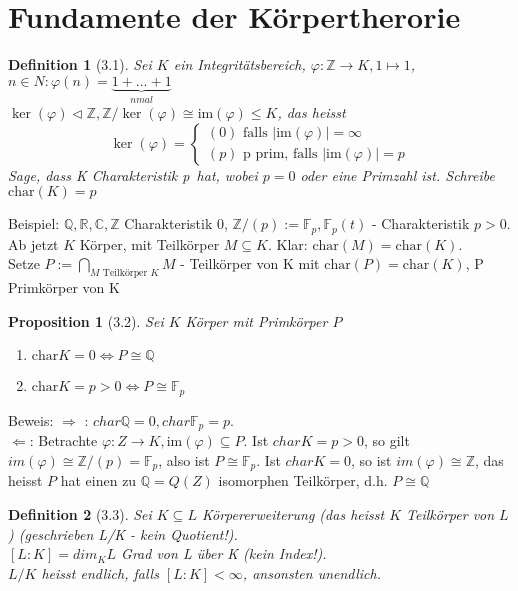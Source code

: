 \documentclass[10pt,a4paper]{article}
\newtheorem{defi}{Definition}
\newtheorem{prop}{Proposition}
\begin{document}
\section{Fundamente der Körpertherorie}
\begin{defi}[3.1]
Sei $K$ ein Integritätsbereich, $\varphi: \mathbb{Z} \rightarrow K, 1 \mapsto 1$, $n \in N : \varphi(n) = \underbrace{1 + ... + 1}_{n mal}$\\
$\ker(\varphi) \lhd \mathbb{Z}, \mathbb{Z}/\ker(\varphi) \cong \textrm{im}(\varphi) \le K$, das heisst
$$\ker(\varphi) = \begin{cases}(0)\textrm{ falls } |\textrm{im}(\varphi)| = \infty\\ (p) \textrm{ p prim, falls } |\textrm{im}(\varphi)| = p\end{cases}$$
Sage, dass K \glqq Charakteristik p\grqq \ hat, wobei $p=0$ oder eine Primzahl ist. Schreibe \glqq$\textrm{char}(K) = p$\grqq
\end{defi}
Beispiel: $\mathbb{Q},\mathbb{R},\mathbb{C},\mathbb{Z}$ Charakteristik 0, $\mathbb{Z}/(p) := \mathbb{F}_p, \mathbb{F}_p(t)$ - Charakteristik $p > 0$.\\
\bigskip
Ab jetzt $K$ Körper, mit Teilkörper $M \subseteq K$. Klar: $\textrm{char}(M) = \textrm{char}(K)$.\\
Setze $P := \bigcap_{M\textrm{ Teilkörper }K} M$ - Teilkörper von K mit $\textrm{char}(P) = \textrm{char}(K)$, P Primkörper von K
\begin{prop}[3.2]
Sei $K$ Körper mit Primkörper $P$
\begin{enumerate}
 \item $\textrm{char} K = 0 \Leftrightarrow P \cong \mathbb{Q}$
 \item $\textrm{char} K = p > 0 \Leftrightarrow P \cong \mathbb{F}_p$
\end{enumerate}
\end{prop}

Beweis: \glqq $\Rightarrow$ \grqq : $char \mathbb{Q} = 0, char \mathbb{F}_p = p$.\\
\glqq $\Leftarrow$\grqq : Betrachte $\varphi: Z \rightarrow K, \textrm{im}(\varphi) \subseteq P$. Ist $char K = p > 0$, so gilt $im(\varphi) \cong \mathbb{Z}/(p) = \mathbb{F}_p$, also ist $P \cong \mathbb{F}_p$. Ist $char K = 0$, so ist $im(\varphi) \cong \mathbb{Z}$, das heisst $P$ hat einen zu $\mathbb{Q} = Q(Z)$ isomorphen Teilkörper, d.h. $P \cong \mathbb{Q}$

\begin{defi}[3.3]
Sei $K \subseteq L$ \emph{Körpererweiterung} (das heisst $K$ Teilkörper von $L$) (geschrieben L/K - kein Quotient!).\\
$[L:K] = dim_K L$ \emph{Grad von L über K} (kein Index!).\\
$L/K$ heisst \emph{endlich}, falls $[L:K] < \infty$, ansonsten \emph{unendlich}.
\end{defi}
\end{document}
